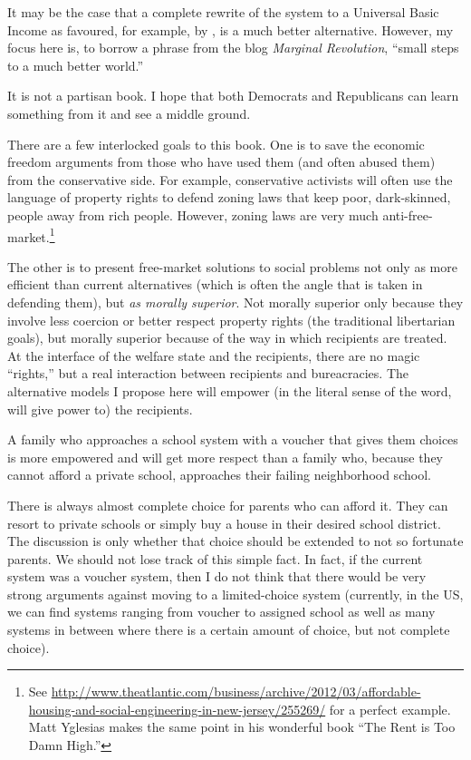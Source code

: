 It may be the case that a complete rewrite of the system to a Universal Basic
Income as favoured, for example, by \citet{Murray_IOH}, is a much better
alternative. However, my focus here is, to borrow a phrase from the blog
\emph{Marginal Revolution}, ``small steps to a much better world.''

It is not a partisan book. I hope that both Democrats and Republicans can learn
something from it and see a middle ground.

\bigskip

There are a few interlocked goals to this book. One is to save the economic
freedom arguments from those who have used them (and often abused them) from
the conservative side. For example, conservative activists will often use the
language of property rights to defend zoning laws that keep poor, dark-skinned,
people away from rich people. However, zoning laws are very much
anti-free-market.\footnote{See
\url{http://www.theatlantic.com/business/archive/2012/03/affordable-housing-and-social-engineering-in-new-jersey/255269/}
for a perfect example. Matt Yglesias makes the same point in his wonderful book
``The Rent is Too Damn High.''} %

The other is to present free-market solutions to social problems not only as
more efficient than current alternatives (which is often the angle that is
taken in defending them), but \emph{as morally superior}. Not morally superior
only because they involve less coercion or better respect property rights (the
traditional libertarian goals), but morally superior because of the way in
which recipients are treated. At the interface of the welfare state and the
recipients, there are no magic ``rights,'' but a real interaction between
recipients and bureacracies. The alternative models I propose here will empower
(in the literal sense of the word, will give power to) the recipients.

A family who approaches a school system with a voucher that gives them choices
is more empowered and will get more respect than a family who, because they
cannot afford a private school, approaches their failing neighborhood school.

There is always almost complete choice for parents who can afford it. They can
resort to private schools or simply buy a house in their desired school
district. The discussion is only whether that choice should be extended to not
so fortunate parents. We should not lose track of this simple fact.  In fact,
if the current system was a voucher system, then I do not think that there
would be very strong arguments against moving to a limited-choice system
(currently, in the US, we can find systems ranging from voucher to assigned
school as well as many systems in between where there is a certain amount of
choice, but not complete choice).

